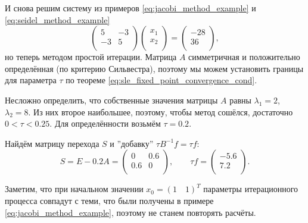 \documentclass{article}
\begin{document}
\begin{example}\label{eq:sle_fixed_point_example}
	И снова решим систему из примеров \eqref{eq:jacobi_method_example} и
	\eqref{eq:seidel_method_example}
	\[
		\begin{pmatrix}
			5	& -3 \\
			-3	& 5  \\
		\end{pmatrix}
		\begin{pmatrix}
			x_1 \\
			x_2 \\
		\end{pmatrix}
		=
		\begin{pmatrix}
			-28 \\
			36  \\
		\end{pmatrix}
		,
	\]
	но теперь методом простой итерации. Матрица $A$ симметричная и
	положительно определённая (по критерию Сильвестра), поэтому мы можем
	установить границы для параметра $\tau$ по теореме
	\eqref{eq:sle_fixed_point_convergence_cond}.

	Несложно определить, что собственные значения матрицы $A$ равны
	$\lambda_1=2$, $\lambda_2=8$. Из них второе наибольшее, поэтому,
	чтобы метод сошёлся, достаточно $0<\tau<0.25$. Для определённости
	возьмём $\tau=0.2$.

	Найдём матрицу перехода $S$ и ''добавку'' $\tau B^{-1}f=\tau f$:
	\[S=E-0.2A=
		\begin{pmatrix}
			0	& 0.6 \\
			0.6	& 0   \\
		\end{pmatrix}
		,\qquad
		\tau f=
		\begin{pmatrix}
			-5.6 \\
			7.2  \\
		\end{pmatrix}
		.
	\]

	Заметим, что при начальном значении $x_0=(1\quad 1)^T$ параметры
	итерационного процесса совпадут с теми, что были получены в примере
	\eqref{eq:jacobi_method_example}, поэтому не станем повторять расчёты.
\end{example}
\end{document}
